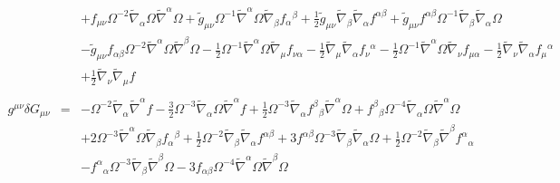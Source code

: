 \documentclass[10pt,letterpaper]{article}
\numberwithin{equation}{section}
\begin{document}
\begin{eqnarray}
&& + f_{\mu \nu } \Omega^{-2} \tilde{\nabla}_{\alpha }\Omega \tilde{\nabla}^{\alpha }\Omega + \tilde{g}_{\mu \nu } \Omega^{-1} \tilde{\nabla}^{\alpha }\Omega \tilde{\nabla}_{\beta }f_{\alpha }{}^{\beta } + \tfrac{1}{2} \tilde{g}_{\mu \nu } \tilde{\nabla}_{\beta }\tilde{\nabla}_{\alpha }f^{\alpha \beta } + \tilde{g}_{\mu \nu } f^{\alpha \beta } \Omega^{-1} \tilde{\nabla}_{\beta }\tilde{\nabla}_{\alpha }\Omega \nonumber \\ 
&& -  \tilde{g}_{\mu \nu } f_{\alpha \beta } \Omega^{-2} \tilde{\nabla}^{\alpha }\Omega \tilde{\nabla}^{\beta }\Omega -  \tfrac{1}{2} \Omega^{-1} \tilde{\nabla}^{\alpha }\Omega \tilde{\nabla}_{\mu }f_{\nu \alpha } -  \tfrac{1}{2} \tilde{\nabla}_{\mu }\tilde{\nabla}_{\alpha }f_{\nu }{}^{\alpha } -  \tfrac{1}{2} \Omega^{-1} \tilde{\nabla}^{\alpha }\Omega \tilde{\nabla}_{\nu }f_{\mu \alpha } -  \tfrac{1}{2} \tilde{\nabla}_{\nu }\tilde{\nabla}_{\alpha }f_{\mu }{}^{\alpha } \nonumber \\ 
&& + \tfrac{1}{2} \tilde{\nabla}_{\nu }\tilde{\nabla}_{\mu }f
\\  \nonumber\\ 
g^{\mu\nu}\delta G_{\mu\nu}&=& - \Omega^{-2} \tilde{\nabla}_{\alpha }\tilde{\nabla}^{\alpha }f -  \tfrac{3}{2} \Omega^{-3} \tilde{\nabla}_{\alpha }\Omega \tilde{\nabla}^{\alpha }f + \tfrac{1}{2} \Omega^{-3} \tilde{\nabla}_{\alpha }f^{\beta }{}_{\beta } \tilde{\nabla}^{\alpha }\Omega + f^{\beta }{}_{\beta } \Omega^{-4} \tilde{\nabla}_{\alpha }\Omega \tilde{\nabla}^{\alpha }\Omega \nonumber \\ 
&& + 2 \Omega^{-3} \tilde{\nabla}^{\alpha }\Omega \tilde{\nabla}_{\beta }f_{\alpha }{}^{\beta } + \tfrac{1}{2} \Omega^{-2} \tilde{\nabla}_{\beta }\tilde{\nabla}_{\alpha }f^{\alpha \beta } + 3 f^{\alpha \beta } \Omega^{-3} \tilde{\nabla}_{\beta }\tilde{\nabla}_{\alpha }\Omega + \tfrac{1}{2} \Omega^{-2} \tilde{\nabla}_{\beta }\tilde{\nabla}^{\beta }f^{\alpha }{}_{\alpha } \nonumber \\ 
&& -  f^{\alpha }{}_{\alpha } \Omega^{-3} \tilde{\nabla}_{\beta }\tilde{\nabla}^{\beta }\Omega - 3 f_{\alpha \beta } \Omega^{-4} \tilde{\nabla}^{\alpha }\Omega \tilde{\nabla}^{\beta }\Omega 
\end{eqnarray}
%
%
%
\end{document}
